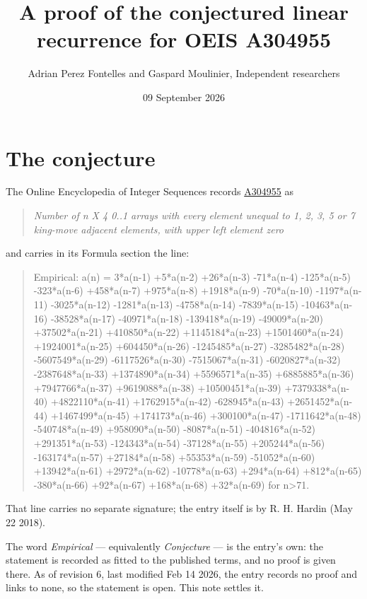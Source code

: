 \documentclass[11pt]{article}
\title{A proof of the conjectured linear recurrence for OEIS A304955}
\author{Adrian Perez Fontelles and Gaspard Moulinier, Independent researchers}
\date{09 September 2026}
\theoremstyle{definition}
\begin{document}
\maketitle
\section{The conjecture}

The Online Encyclopedia of Integer Sequences records \href{https://oeis.org/A304955}{A304955} as

\begin{quote}\itshape Number of n X 4 0..1 arrays with every element unequal to 1, 2, 3, 5 or 7 king-move adjacent elements, with upper left element zero\end{quote}

and carries in its Formula section the line:

\begin{quote}\ttfamily Empirical: a(n) = 3*a(n-1) +5*a(n-2) +26*a(n-3) -71*a(n-4) -125*a(n-5) -323*a(n-6) +458*a(n-7) +975*a(n-8) +1918*a(n-9) -70*a(n-10) -1197*a(n-11) -3025*a(n-12) -1281*a(n-13) -4758*a(n-14) -7839*a(n-15) -10463*a(n-16) -38528*a(n-17) -40971*a(n-18) -139418*a(n-19) -49009*a(n-20) +37502*a(n-21) +410850*a(n-22) +1145184*a(n-23) +1501460*a(n-24) +1924001*a(n-25) +604450*a(n-26) -1245485*a(n-27) -3285482*a(n-28) -5607549*a(n-29) -6117526*a(n-30) -7515067*a(n-31) -6020827*a(n-32) -2387648*a(n-33) +1374890*a(n-34) +5596571*a(n-35) +6885885*a(n-36) +7947766*a(n-37) +9619088*a(n-38) +10500451*a(n-39) +7379338*a(n-40) +4822110*a(n-41) +1762915*a(n-42) -628945*a(n-43) +2651452*a(n-44) +1467499*a(n-45) +174173*a(n-46) +300100*a(n-47) -1711642*a(n-48) -540748*a(n-49) +958090*a(n-50) -8087*a(n-51) -404816*a(n-52) +291351*a(n-53) -124343*a(n-54) -37128*a(n-55) +205244*a(n-56) -163174*a(n-57) +27184*a(n-58) +55353*a(n-59) -51052*a(n-60) +13942*a(n-61) +2972*a(n-62) -10778*a(n-63) +294*a(n-64) +812*a(n-65) -380*a(n-66) +92*a(n-67) +168*a(n-68) +32*a(n-69) for n>71.\end{quote}

That line carries no separate signature; the entry itself is by R. H. Hardin (May 22 2018).

The word {\itshape Empirical} --- equivalently {\itshape Conjecture} --- is the entry's own: the statement is recorded as fitted to the published terms, and no proof is given there. As of revision 6, last modified Feb 14 2026, the entry records no proof and links to none, so the statement is open. This note settles it.
\end{document}
